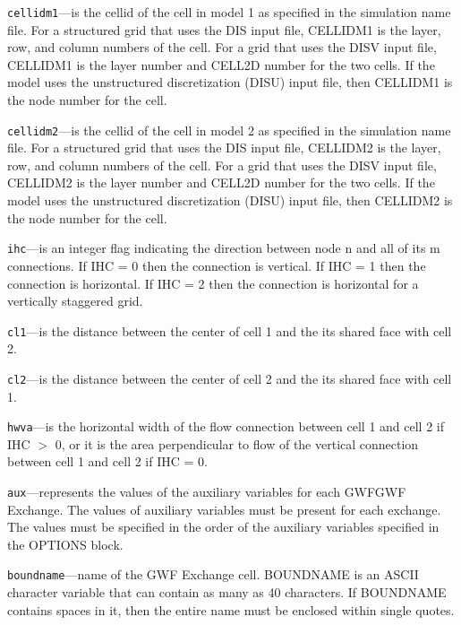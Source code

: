 \begin{description}
\item \texttt{cellidm1}---is the cellid of the cell in model 1 as specified in the simulation name file. For a structured grid that uses the DIS input file, CELLIDM1 is the layer, row, and column numbers of the cell.   For a grid that uses the DISV input file, CELLIDM1 is the layer number and CELL2D number for the two cells.  If the model uses the unstructured discretization (DISU) input file, then CELLIDM1 is the node number for the cell.

\item \texttt{cellidm2}---is the cellid of the cell in model 2 as specified in the simulation name file. For a structured grid that uses the DIS input file, CELLIDM2 is the layer, row, and column numbers of the cell.   For a grid that uses the DISV input file, CELLIDM2 is the layer number and CELL2D number for the two cells.  If the model uses the unstructured discretization (DISU) input file, then CELLIDM2 is the node number for the cell.

\item \texttt{ihc}---is an integer flag indicating the direction between node n and all of its m connections. If IHC = 0 then the connection is vertical.  If IHC = 1 then the connection is horizontal. If IHC = 2 then the connection is horizontal for a vertically staggered grid.

\item \texttt{cl1}---is the distance between the center of cell 1 and the its shared face with cell 2.

\item \texttt{cl2}---is the distance between the center of cell 2 and the its shared face with cell 1.

\item \texttt{hwva}---is the horizontal width of the flow connection between cell 1 and cell 2 if IHC $>$ 0, or it is the area perpendicular to flow of the vertical connection between cell 1 and cell 2 if IHC = 0.

\item \texttt{aux}---represents the values of the auxiliary variables for each GWFGWF Exchange. The values of auxiliary variables must be present for each exchange. The values must be specified in the order of the auxiliary variables specified in the OPTIONS block.

\item \texttt{boundname}---name of the GWF Exchange cell.  BOUNDNAME is an ASCII character variable that can contain as many as 40 characters.  If BOUNDNAME contains spaces in it, then the entire name must be enclosed within single quotes.

\end{description}

